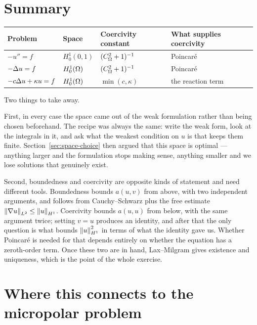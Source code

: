 \documentclass[11pt,a4paper]{article}
\begin{document}
\section{Summary}

\begin{center}
\begin{tabular}{@{}llll@{}}
\toprule
Problem & Space & Coercivity constant & What supplies coercivity \\
\midrule
$-u''=f$ & $H^1_0(0,1)$ & $(C_\Omega^{2}+1)^{-1}$ & Poincar\'e \\
$-\Delta u = f$ & $H^{1}_{0}(\Omega)$ & $(C_\Omega^{2}+1)^{-1}$ & Poincar\'e \\
$-c\Delta u + \kappa u = f$ & $H^{1}_{0}(\Omega)$ & $\min(c,\kappa)$ & the reaction term \\
\bottomrule
\end{tabular}
\end{center}

\medskip

Two things to take away.

First, in every case the space came out of the weak formulation rather than being
chosen beforehand. The recipe was always the same: write the weak form, look at
the integrals in it, and ask what the weakest condition on $u$ is that keeps them
finite. Section~\ref{sec:space-choice} then argued that this space is optimal ---
anything larger and the formulation stops making sense, anything smaller and we
lose solutions that genuinely exist.

Second, boundedness and coercivity are opposite kinds of statement and need
different tools. Boundedness bounds $a(u,v)$ from above, with two independent
arguments, and follows from Cauchy--Schwarz plus the free estimate
$\left\lVert \nabla u \right\rVert_{L^{2}} \le \left\lVert u \right\rVert_{H^{1}}$. Coercivity bounds $a(u,u)$ from below, with the
same argument twice; setting $v=u$ produces an identity, and after that the only
question is what bounds $\left\lVert u \right\rVert_{H^{1}}^{2}$ in terms of what the identity gave us.
Whether Poincar\'e is needed for that depends entirely on whether the equation
has a zeroth-order term. Once these two are in hand, Lax--Milgram gives existence
and uniqueness, which is the point of the whole exercise.

\section*{Where this connects to the micropolar problem}
\end{document}
